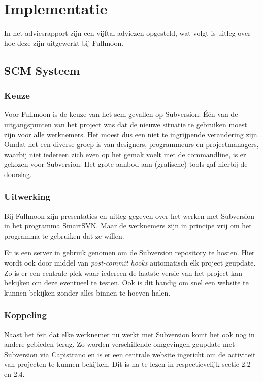 \chapter{Implementatie}

In het adviesrapport zijn een vijftal adviezen opgesteld, wat volgt is uitleg over hoe deze zijn uitgewerkt bij Fullmoon.

\section{SCM Systeem}

\subsection{Keuze}

Voor Fullmoon is de keuze van het {\sc scm} gevallen op Subversion. Één van de uitgangspunten van het project was dat de nieuwe situatie te gebruiken moest zijn voor alle werknemers. Het moest dus een niet te ingrijpende verandering zijn. Omdat het een diverse groep is van designers, programmeurs en projectmanagers, waarbij niet iedereen zich even op het gemak voelt met de commandline, is er gekozen voor Subversion. Het grote aanbod aan (grafische) tools gaf hierbij de doorslag.

\subsection{Uitwerking}

Bij Fullmoon zijn presentaties en uitleg gegeven over het werken met Subversion in het programma SmartSVN. Maar de werknemers zijn in principe vrij om het programma te gebruiken dat ze willen.

Er is een server in gebruik genomen om de Subversion repository te hosten. Hier wordt ook door middel van \emph{post-commit hooks} automatisch elk project geupdate. Zo is er een centrale plek waar iedereen de laatste versie van het project kan bekijken om deze eventueel te testen. Ook is dit handig om snel een website te kunnen bekijken zonder alles binnen te hoeven halen.

\subsection{Koppeling}

Naast het feit dat elke werknemer nu werkt met Subversion komt het ook nog in andere gebieden terug. Zo worden verschillende omgevingen geupdate met Subversion via Capistrano en is er een centrale website ingericht om de activiteit van projecten te kunnen bekijken. Dit is na te lezen in respectievelijk sectie 2.2 en 2.4.

